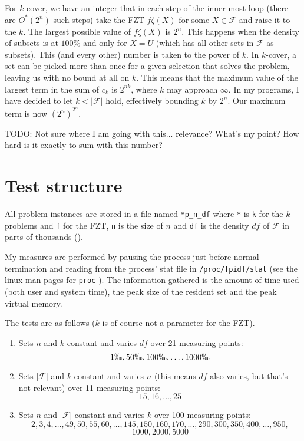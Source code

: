 \documentclass[a4paper, titlepage]{article}
\newcommand{\code}{\texttt}
\begin{document}
For $k$-cover, we have an integer that in each step of the inner-most loop (there are $O^*(2^n)$ such steps) take the FZT $f\zeta(X)$ for some $ X \in \mathcal{F}$ and raise it to the $k$. The largest possible value of $f\zeta(X)$ is $2^n$. This happens when the density of subsets is at $100\%$ and only for $X=U$ (which has all other sets in $\mathcal{F}$ as subsets). This (and every other) number is taken to the power of $k$. In $k$-cover, a set can be picked more than once for a given selection that solves the problem, leaving us with no bound at all on $k$. This means that the maximum value of the largest term in the sum of $c_k$ is $2^{nk}$, where $k$ may approach $\infty$. In my programs, I have decided to let $k < |\mathcal{F}|$ hold, effectively bounding $k$ by $2^n$. Our maximum term is now $(2^n)^{2^n}$. 

TODO: Not sure where I am going with this... relevance? What's my point? How hard is it exactly to sum with this number? 

\section{Test structure}
All problem instances are stored in a file named \code{*p\_n\_df} where \code{*} is \code{k} for the $k$-problems and \code{f} for the FZT, \code{n} is the size of $n$ and \code{df} is the density $df$ of $\mathcal{F}$ in parts of thousands (\permil).

My measures are performed by pausing the process just before normal termination and reading from the process' stat file in \code{/proc/[pid]/stat} (see the linux man pages for \code{proc} \cite{proc}). The information gathered is the amount of time used (both user and system time), the peak size of the resident set and the peak virtual memory.

The tests are as follows ($k$ is of course not a parameter for the FZT).

\begin{enumerate}
 \item Sets $n$ and $k$ constant and varies $df$ over 21 measuring points: $$1\permil, 50\permil, 100\permil, \ldots, 1000\permil$$
 \item Sets $|\mathcal{F}|$ and $k$ constant and varies $n$ (this means $df$ also varies, but that's not relevant) over 11 measuring points: $$15, 16, \ldots, 25$$
 \item Sets $n$ and $|\mathcal{F}|$ constant and varies $k$ over 100 measuring points: $$2, 3, 4, \ldots, 49, 50, 55, 60, \ldots, 145, 150, 160, 170, \ldots, 290, 300, 350, 400, \ldots, 950,$$ $$1000, 2000, 5000$$

\end{enumerate}
\end{document}
